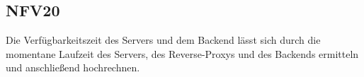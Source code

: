 \subsection*{NFV20}

Die Verfügbarkeitszeit des \Gls{Server}s und dem \Gls{Backend} lässt sich durch die momentane Laufzeit des \Gls{Server}s,
des \Gls{Reverse-Proxy}s und des \Gls{Backend}s ermitteln und anschließend hochrechnen.